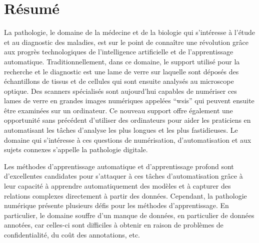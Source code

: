 \chapter*{Résumé}

La pathologie, le domaine de la médecine et de la biologie qui s'intéresse à l'étude et au diagnostic des maladies, est sur le point de connaître une révolution grâce aux progrès technologiques de l'intelligence artificielle et de l'apprentissage automatique. Traditionnellement, dans ce domaine, le support utilisé pour la recherche et le diagnostic est une lame de verre sur laquelle sont déposés des échantillons de tissus et de cellules qui sont ensuite analysés au microscope optique. Des scanners spécialisés sont aujourd'hui capables de numériser ces lames de verre en grandes images numériques appelées ``\acrlong{wsi}s'' qui peuvent ensuite être examinées sur un ordinateur. Ce nouveau support offre également une opportunité sans précédent d'utiliser des ordinateurs pour aider les praticiens en automatisant les tâches d'analyse les plus longues et les plus fastidieuses. Le domaine qui s'intéresse à ces questions de numérisation, d'automatisation et aux sujets connexes s'appelle la pathologie digitale.

Les méthodes d'apprentissage automatique et d'apprentissage profond sont d'excellentes candidates pour s'attaquer à ces tâches d'automatisation grâce à leur capacité à apprendre automatiquement des modèles et à capturer des relations complexes directement à partir des données. Cependant, la pathologie numérique présente plusieurs défis pour les méthodes d'apprentissage. En particulier, le domaine souffre d'un manque de données, en particulier de données annotées, car celles-ci sont difficiles à obtenir en raison de problèmes de confidentialité, du coût des annotations, etc. 

